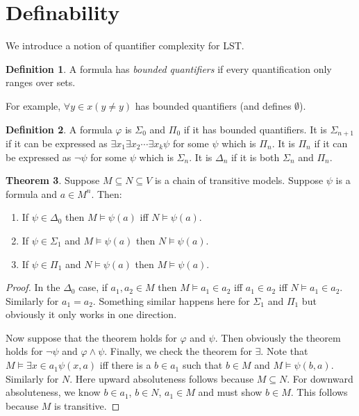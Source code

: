 \documentclass[12pt]{report}
\newcommand{\dfn}[1]{\emph{#1}\index{#1}}
\theoremstyle{definition}
\newtheorem{theorem}{Theorem}[chapter]
\newtheorem{definition}[theorem]{Definition}
\begin{document}
\section{Definability}
We introduce a notion of quantifier complexity for LST.
\begin{definition}
A formula has \dfn{bounded quantifiers} if every quantification only ranges over sets.
\end{definition}
For example, $\forall y \in x(y \neq y)$ has bounded quantifiers (and defines $\emptyset$).
\begin{definition}
A formula $\varphi$ is $\Sigma_0$ and $\Pi_0$ if it has bounded quantifiers. It is $\Sigma_{n+1}$ if it can be expressed as $\exists x_1 \exists x_2 \cdots \exists x_k \psi$ for some $\psi$ which is $\Pi_n$. It is $\Pi_n$ if it can be expressed as $\neg\psi$ for some $\psi$ which is $\Sigma_n$. It is $\Delta_n$ if it is both $\Sigma_n$ and $\Pi_n$.
\end{definition}

\begin{theorem}
Suppose $M \subseteq N \subseteq V$ is a chain of transitive models. Suppose $\psi$ is a formula and $a \in M^n$. Then:
\begin{enumerate}
\item If $\psi \in \Delta_0$ then $M \models \psi(a)$ iff $N \models \psi(a)$.
\item If $\psi \in \Sigma_1$ and $M \models \psi(a)$ then $N \models \psi(a)$.
\item If $\psi \in \Pi_1$ and $N \models \psi(a)$ then $M \models \psi(a)$.
\end{enumerate}
\end{theorem}
\begin{proof}
In the $\Delta_0$ case, if $a_1, a_2 \in M$ then $M \models a_1 \in a_2$ iff $a_1 \in a_2$ iff $N \models a_1 \in a_2$. Similarly for $a_1 = a_2$. Something similar happens here for $\Sigma_1$ and $\Pi_1$ but obviously it only works in one direction.

Now suppose that the theorem holds for $\varphi$ and $\psi$. Then obviously the theorem holds for $\neg\psi$ and $\varphi \wedge \psi$. Finally, we check the theorem for $\exists$. Note that $M \models \exists x \in a_1 \psi(x, a)$ iff there is a $b \in a_1$ such that $b \in M$ and $M \models \psi(b, a)$. Similarly for $N$. Here upward absoluteness follows because $M \subseteq N$. For downward absoluteness, we know $b \in a_1$, $b \in N$, $a_1 \in M$ and must show $b \in M$. This follows because $M$ is transitive.
\end{proof}
\end{document}
